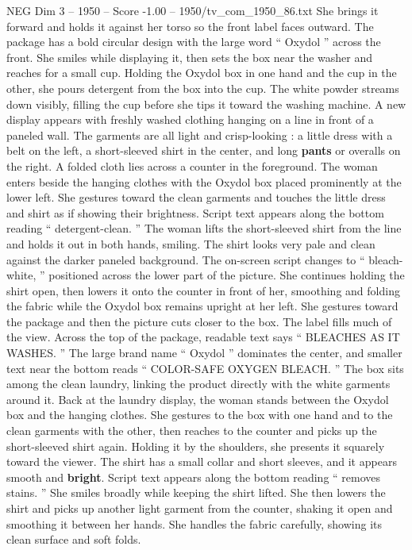 \begin{textsample}{NEG Dim 3 – 1950 – Score -1.00 – 1950/tv\_com\_1950\_86.txt}
She brings it forward and holds it against her torso so the front label faces outward.
The package has a bold circular design with the large word “ Oxydol ” across the front.
She smiles while displaying it, then sets the box near the washer and reaches for a small cup.
Holding the Oxydol box in one hand and the cup in the other, she pours detergent from the box into the cup.
The white powder streams down visibly, filling the cup before she tips it toward the washing machine.
A new display appears with freshly washed clothing hanging on a line in front of a paneled wall.
The garments are all light and crisp-looking : a little dress with a belt on the left, a short-sleeved shirt in the center, and long \textbf{pants} or overalls on the right.
A folded cloth lies across a counter in the foreground.
The woman enters beside the hanging clothes with the Oxydol box placed prominently at the lower left.
She gestures toward the clean garments and touches the little dress and shirt as if showing their brightness.
Script text appears along the bottom reading “ detergent-clean. ” The woman lifts the short-sleeved shirt from the line and holds it out in both hands, smiling.
The shirt looks very pale and clean against the darker paneled background.
The on-screen script changes to “ bleach-white, ” positioned across the lower part of the picture.
She continues holding the shirt open, then lowers it onto the counter in front of her, smoothing and folding the fabric while the Oxydol box remains upright at her left.
She gestures toward the package and then the picture cuts closer to the box.
The label fills much of the view.
Across the top of the package, readable text says “ BLEACHES AS IT WASHES. ” The large brand name “ Oxydol ” dominates the center, and smaller text near the bottom reads “ COLOR-SAFE OXYGEN BLEACH. ” The box sits among the clean laundry, linking the product directly with the white garments around it.
Back at the laundry display, the woman stands between the Oxydol box and the hanging clothes.
She gestures to the box with one hand and to the clean garments with the other, then reaches to the counter and picks up the short-sleeved shirt again.
Holding it by the shoulders, she presents it squarely toward the viewer.
The shirt has a small collar and short sleeves, and it appears smooth and \textbf{bright}.
Script text appears along the bottom reading “ removes stains. ” She smiles broadly while keeping the shirt lifted.
She then lowers the shirt and picks up another light garment from the counter, shaking it open and smoothing it between her hands.
She handles the fabric carefully, showing its clean surface and soft folds.

\end{textsample}
